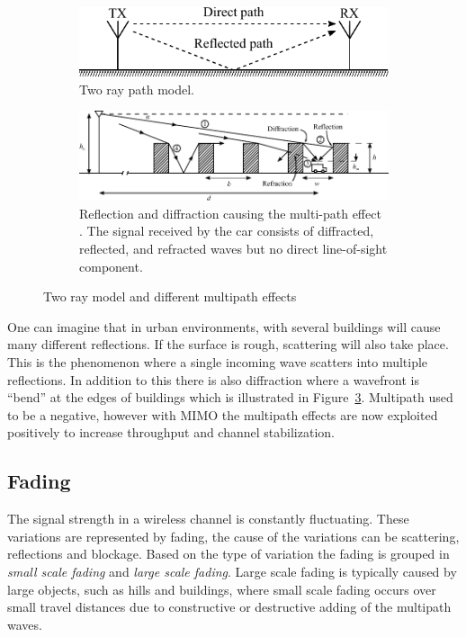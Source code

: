 \begin{figure}[htbp]
    \centering
    \begin{subfigure}[b]{0.6\textwidth} 
     \includegraphics[width=\linewidth]{img/analysis/tworay}
    \caption{Two ray path model.}
    \label{fig:mul_tworay}
    \end{subfigure}
    \centering
    \begin{subfigure}[b]{0.7\textwidth} 
      \includegraphics[width=\linewidth]{img/analysis/parsons_multipath}
      \caption{Reflection and diffraction causing the multi-path effect \cite{parsons2000mobile}. The signal received by the car consists of diffracted, reflected, and refracted waves but no direct line-of-sight component.}
      \label{fig:mul_reflec_diffrac}
    \end{subfigure}
    \caption{Two ray model and different multipath effects}
\end{figure}

One can imagine that in urban environments, with several buildings will cause many different reflections. If the surface is rough, scattering will also take place. This is the phenomenon where a single incoming wave scatters into multiple reflections. In addition to this there is also diffraction where a wavefront is ``bend'' at the edges of buildings which is illustrated in Figure~\ref{fig:mul_reflec_diffrac}. Multipath used to be a negative, however with MIMO the multipath effects are now exploited positively to increase throughput and channel stabilization. 

\subsection{Fading}
The signal strength in a wireless channel is constantly fluctuating. These variations are represented by fading, the cause of the variations can be scattering, reflections and blockage. Based on the type of variation the fading is grouped in \emph{small scale fading} and \emph{large scale fading}. Large scale fading is typically caused by large objects, such as hills and buildings, where small scale fading occurs over small travel distances due to constructive or destructive adding of the multipath waves. 

